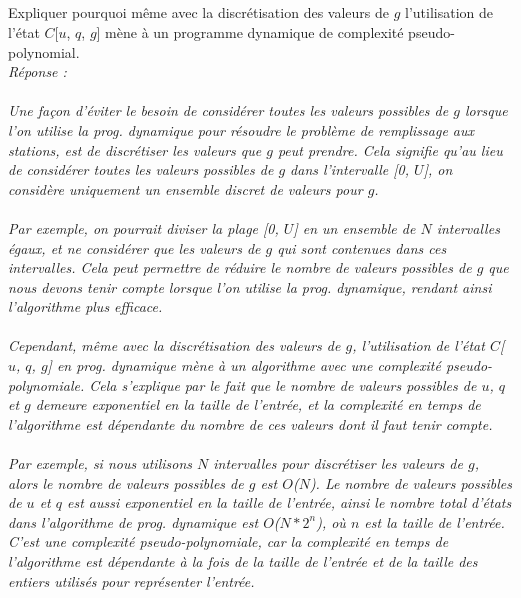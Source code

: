 \documentclass[a4paper,11pt]{article}
\begin{document}
	\subsection{}\label{subsec:Q7}
        Expliquer pourquoi même avec la discrétisation des valeurs de $g$ l’utilisation de l’état $C$[$u$, $q$, $g$] mène à un programme dynamique de complexité pseudo-polynomial.	
            \\\textit{Réponse : \\\\     
Une façon d'éviter le besoin de considérer toutes les valeurs possibles de $g$ lorsque l'on utilise la prog. dynamique pour résoudre le problème de remplissage aux stations, est de discrétiser les valeurs que $g$ peut prendre. Cela signifie qu'au lieu de considérer toutes les valeurs possibles de $g$ dans l'intervalle [0, $U$], on considère uniquement un ensemble discret de valeurs pour $g$.\\\\
Par exemple, on pourrait diviser la plage [0, $U$]  en un ensemble de $N$ intervalles égaux, et ne considérer que les valeurs de $g$ qui sont contenues dans ces intervalles. Cela peut permettre de réduire le nombre de valeurs possibles de $g$ que nous devons tenir compte lorsque l'on utilise la prog. dynamique, rendant ainsi l'algorithme plus efficace.\\\\
Cependant, même avec la discrétisation des valeurs de $g$, l'utilisation de l'état $C$[$u$, $q$, $g$] en prog. dynamique mène à un algorithme avec une complexité pseudo-polynomiale. Cela s'explique par le fait que le nombre de valeurs possibles de $u$, $q$ et $g$ demeure exponentiel en la taille de l'entrée, et la complexité en temps de l'algorithme est dépendante du nombre de ces valeurs dont il faut tenir compte.\\\\
Par exemple, si nous utilisons $N$ intervalles pour discrétiser les valeurs de $g$, alors le nombre de valeurs possibles de $g$ est $O$($N$). Le nombre de valeurs possibles de $u$ et $q$ est aussi exponentiel en la taille de l'entrée, ainsi le nombre total d'états dans l'algorithme de prog. dynamique est $O$($N*{2^{n}}$), où $n$ est la taille de l'entrée. C'est une complexité pseudo-polynomiale, car la complexité en temps de l'algorithme est dépendante à la fois de la taille de l'entrée et de la taille des entiers utilisés pour représenter l'entrée.\\\\}
\end{document}
